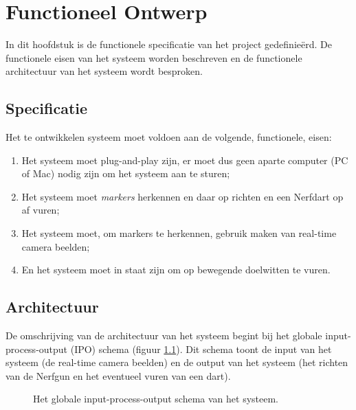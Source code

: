 \chapter{Functioneel Ontwerp}
\label{chap:functional}


In dit hoofdstuk is de functionele specificatie van het \autonerf project
gedefinieërd. De functionele eisen van het systeem worden beschreven en de
functionele architectuur van het systeem wordt besproken.

\section{Specificatie}

Het te ontwikkelen systeem moet voldoen aan de volgende, functionele, eisen:

\begin{enumerate}
    \item Het systeem moet plug-and-play zijn, er moet dus geen aparte computer
        (PC of Mac) nodig zijn om het systeem aan te sturen;
    \item Het systeem moet \emph{markers} herkennen en daar op richten en een
        Nerfdart op af vuren;
    \item Het systeem moet, om markers te herkennen, gebruik maken van real-time
        camera beelden;
    \item En het systeem moet in staat zijn om op bewegende doelwitten te vuren.
\end{enumerate}

\section{Architectuur}
\label{sec:func-architecture}

De omschrijving van de architectuur van het \autonerf systeem begint bij het
globale input-process-output (IPO) schema (figuur \ref{fig:ipo-global}). Dit
schema toont de input van het systeem (de real-time camera beelden) en de output
van het systeem (het richten van de Nerfgun en het eventueel vuren van een dart).

\begin{figure}[H]
    \begin{center}
        
    \end{center}
    \caption{Het globale input-process-output schema van het \autonerf systeem.}
    \label{fig:ipo-global}
\end{figure}

